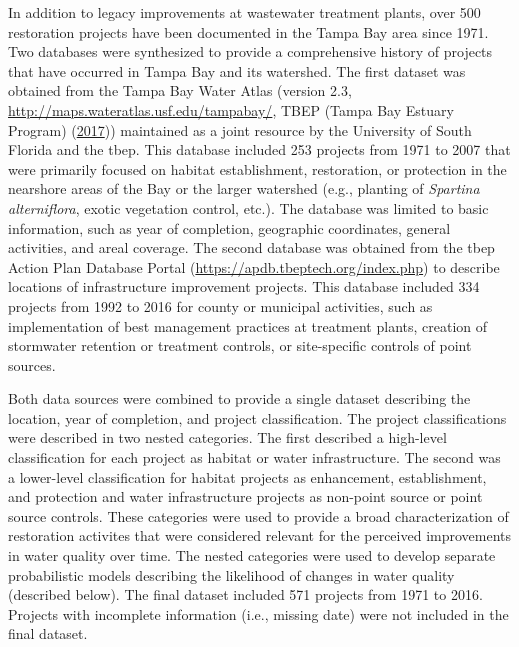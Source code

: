 \documentclass[]{article}
\begin{document}
In addition to legacy improvements at wastewater treatment plants, over
500 restoration projects have been documented in the Tampa Bay area
since 1971. Two databases were synthesized to provide a comprehensive
history of projects that have occurred in Tampa Bay and its watershed.
The first dataset was obtained from the Tampa Bay Water Atlas (version
2.3, \url{http://maps.wateratlas.usf.edu/tampabay/}, TBEP (Tampa Bay
Estuary Program) (\protect\hyperlink{ref-TBEP17}{2017})) maintained as a
joint resource by the University of South Florida and the \ac{tbep}.
This database included 253 projects from 1971 to 2007 that were
primarily focused on habitat establishment, restoration, or protection
in the nearshore areas of the Bay or the larger watershed (e.g.,
planting of \emph{Spartina alterniflora}, exotic vegetation control,
etc.). The database was limited to basic information, such as year of
completion, geographic coordinates, general activities, and areal
coverage. The second database was obtained from the \ac{tbep} Action
Plan Database Portal (\url{https://apdb.tbeptech.org/index.php}) to
describe locations of infrastructure improvement projects. This database
included 334 projects from 1992 to 2016 for county or municipal
activities, such as implementation of best management practices at
treatment plants, creation of stormwater retention or treatment
controls, or site-specific controls of point sources.

Both data sources were combined to provide a single dataset describing
the location, year of completion, and project classification. The
project classifications were described in two nested categories. The
first described a high-level classification for each project as habitat
or water infrastructure. The second was a lower-level classification for
habitat projects as enhancement, establishment, and protection and water
infrastructure projects as non-point source or point source controls.
These categories were used to provide a broad characterization of
restoration activites that were considered relevant for the perceived
improvements in water quality over time. The nested categories were used
to develop separate probabilistic models describing the likelihood of
changes in water quality (described below). The final dataset included
571 projects from 1971 to 2016. Projects with incomplete information
(i.e., missing date) were not included in the final dataset.
\end{document}
